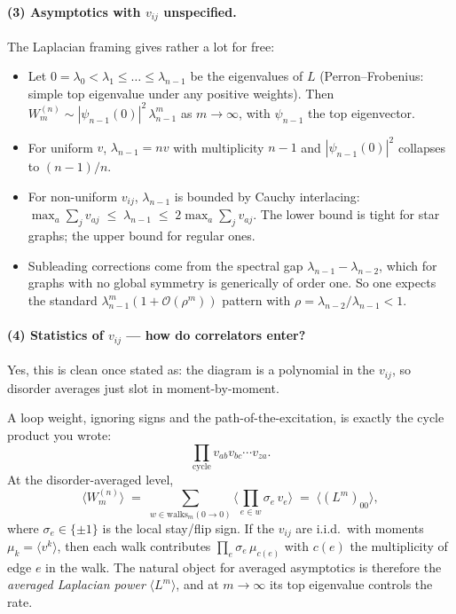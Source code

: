 \documentclass[11pt,a4paper]{article}
\begin{document}
\paragraph{(3) Asymptotics with $v_{ij}$ unspecified.}
The Laplacian framing gives rather a lot for free:
\begin{itemize}[leftmargin=2em,itemsep=2pt]
\item Let $0=\lambda_{0}<\lambda_{1}\leq\dots\leq\lambda_{n-1}$ be the
eigenvalues of $L$ (Perron--Frobenius: simple top eigenvalue under any
positive weights). Then $W^{(n)}_{m}\sim
|\psi_{n-1}(0)|^{2}\,\lambda_{n-1}^{m}$ as $m\!\to\!\infty$, with
$\psi_{n-1}$ the top eigenvector.
\item For uniform $v$, $\lambda_{n-1}=nv$ with multiplicity $n{-}1$ and
$|\psi_{n-1}(0)|^{2}$ collapses to $(n{-}1)/n$.
\item For non-uniform $v_{ij}$, $\lambda_{n-1}$ is bounded by Cauchy
interlacing:
$\max_{a}\sum_{j}v_{aj}\;\leq\;\lambda_{n-1}\;\leq\;2\max_{a}\sum_{j}v_{aj}$.
The lower bound is tight for star graphs; the upper bound for regular ones.
\item Subleading corrections come from the spectral gap
$\lambda_{n-1}-\lambda_{n-2}$, which for graphs with no global symmetry
is generically of order one. So one expects the standard
$\lambda_{n-1}^{m}(1+\mathcal O(\rho^{m}))$ pattern with
$\rho=\lambda_{n-2}/\lambda_{n-1}<1$.
\end{itemize}

\paragraph{(4) Statistics of $v_{ij}$ --- how do correlators enter?}
Yes, this is clean once stated as: the diagram is a polynomial in the
$v_{ij}$, so disorder averages just slot in moment-by-moment.

A loop weight, ignoring signs and the path-of-the-excitation, is exactly
the cycle product you wrote:
\[
\prod_{\text{cycle}} v_{ab}v_{bc}\cdots v_{za}.
\]
At the disorder-averaged level,
\[
\big\langle W^{(n)}_{m}\big\rangle
\;=\;\sum_{w\in\text{walks}_{m}(0\to0)}\!\!\big\langle\prod_{e\in w}\!\sigma_{e}\,v_{e}\big\rangle
\;=\;\big\langle (L^{m})_{00}\big\rangle,
\]
where $\sigma_{e}\in\{\pm 1\}$ is the local stay/flip sign. If the
$v_{ij}$ are i.i.d.\ with moments $\mu_{k}=\langle v^{k}\rangle$, then
each walk contributes $\prod_{e}\sigma_{e}\,\mu_{c(e)}$ with $c(e)$ the
multiplicity of edge $e$ in the walk. The natural object for averaged
asymptotics is therefore the \emph{averaged Laplacian power}
$\langle L^{m}\rangle$, and at $m\!\to\!\infty$ its top eigenvalue
controls the rate.
\end{document}
